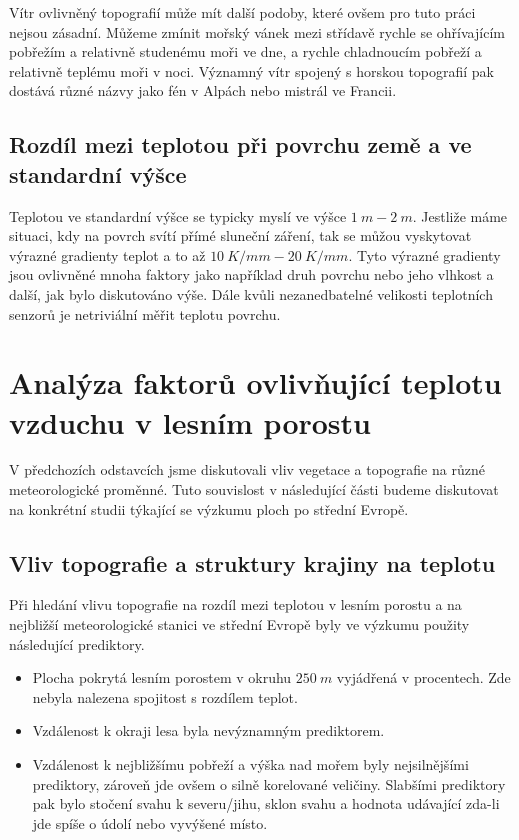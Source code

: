 Vítr ovlivněný topografií může mít další podoby, které ovšem pro tuto práci nejsou zásadní. Můžeme zmínit mořský vánek mezi střídavě rychle se ohřívajícím pobřežím a relativně studenému moři ve dne, a rychle chladnoucím pobřeží a relativně teplému moři v noci. Významný vítr spojený s horskou topografií pak dostává různé názvy jako fén v Alpách nebo mistrál ve Francii\cite{alma}.

\subsection{Rozdíl mezi teplotou při povrchu země a ve standardní výšce}
Teplotou ve standardní výšce se typicky myslí ve výšce $\SI{1}{m}-\SI{2}{m}$. Jestliže máme situaci, kdy na povrch svítí přímé sluneční záření, tak se můžou vyskytovat výrazné gradienty teplot a to až $\SI{10}{K/mm}-\SI{20}{K/mm}$. Tyto výrazné gradienty jsou ovlivněné mnoha faktory jako například druh povrchu nebo jeho vlhkost a další, jak bylo diskutováno výše. Dále kvůli nezanedbatelné velikosti teplotních senzorů je netriviální měřit teplotu povrchu\cite{arya2001}. 

\section{Analýza faktorů ovlivňující teplotu vzduchu v lesním porostu}
V předchozích odstavcích jsme diskutovali vliv vegetace a topografie na různé meteorologické proměnné. Tuto souvislost v následující části budeme diskutovat na konkrétní studii týkající se výzkumu ploch po střední Evropě.

\subsection{Vliv topografie a struktury krajiny na teplotu}
Při hledání vlivu topografie na rozdíl mezi teplotou v lesním porostu a na nejbližší meteorologické stanici ve střední Evropě byly ve výzkumu \cite{ZellwegerFlorian2019Sdou} použity následující prediktory.

\begin{itemize}
	\item Plocha pokrytá lesním porostem v okruhu $\SI{250}{m}$ vyjádřená v procentech. Zde nebyla nalezena spojitost s rozdílem teplot.
	\item Vzdálenost k okraji lesa byla nevýznamným prediktorem. 
	\item Vzdálenost k nejbližšímu pobřeží a výška nad mořem byly nejsilnějšími prediktory, zároveň jde ovšem o silně korelované veličiny. Slabšími prediktory pak bylo stočení svahu k severu/jihu, sklon svahu a hodnota udávající zda-li jde spíše o údolí nebo vyvýšené místo.
\end{itemize}

